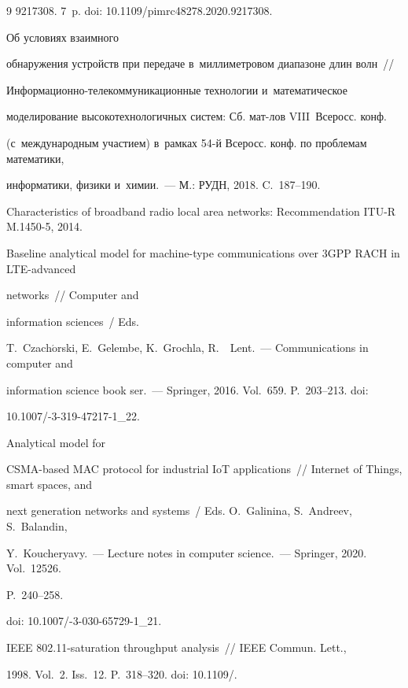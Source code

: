 {{\begin{thebibliography}{9}
9217308. 7~p. doi: 10.1109\!/\!pimrc48278.2020.9217308.







 Об условиях взаимного 


обнаружения устройств при передаче в~миллиметровом диапазоне длин волн~/\!\!/ 


Ин\-фор\-ма\-ци\-он\-но-те\-ле\-ком\-му\-ни\-ка\-ци\-он\-ные технологии и~математическое 


моделирование высокотехнологичных систем: Сб. мат-лов VIII~Всеросс. конф. 


(с~международным участием) в~рамках 54-й Всеросс. конф. по проб\-ле\-мам математики, 


информатики, физики и~химии.~--- М.: РУДН, 2018. C.~187--190.




Characteristics of broadband radio local area networks: Recommendation ITU-R M.1450-5, 2014.






Baseline analytical model for machine-type communications over 3GPP RACH in LTE-advanced 


networks~/\!\!/ Computer and 


information sciences~/ Eds. 


T.~Czach$\acute{\mbox{o}}$rski, E.~Gelembe, K.~Grochla, R.~~Lent.~--- Communications in computer and 


information science book ser.~--- Springer, 2016. Vol.~659. P.~203--213. doi:  


10.1007\!/-3-319-47217-1\_22.




 Analytical model for 


CSMA-based MAC protocol for industrial IoT applications~/\!\!/  Internet of Things, smart spaces, and


next generation networks and systems~/ Eds. O.~Galinina, S.~Andreev, S.~Balandin, 


Y.~Koucheryavy.~--- Lecture notes in computer science.~--- Springer, 2020. Vol.~12526.  


P.~240--258. 


doi: 10.1007\!/-3-030-65729-1\_21.




 IEEE 802.11-saturation throughput analysis~/\!\!/ IEEE Commun. Lett., 


1998. Vol.~2. Iss.~12. P.~318--320. doi: 10.1109\!/.





      \end{thebibliography}


} }
